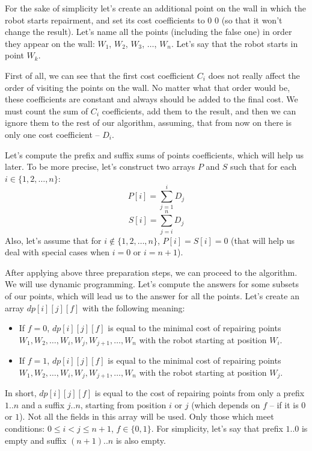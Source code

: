 

For the sake of simplicity let's create an additional point on the wall
	in which the robot starts repairment, and set its cost coefficients to $0$ $0$ (so that it won't change the result).
Let's name all the points (including the false one) in order they appear on the wall: $W_1$, $W_2$, $W_3$, $\ldots$, $W_n$.
Let's say that the robot starts in point $W_k$.

First of all, we can see that the first cost coefficient $C_i$ does not really affect the order of visiting
	the points on the wall.
No matter what that order would be, these coefficients are constant and always should be added to the final cost.
We must count the sum of $C_i$ coefficients, add them to the result, and then we can ignore them to the rest of our algorithm,
	assuming, that from now on there is only one cost coefficient -- $D_i$.

Let's compute the prefix and suffix sums of points coefficients, which will help us later.
To be more precise, let's construct two arrays $P$ and $S$ such that for each $i \in \{1, 2, \ldots, n\}$:
\[ P[i] = \sum_{j = 1}^i D_j \]
\[ S[i] = \sum_{j = i}^n D_j \]
Also, let's assume that for $i \not \in \{1, 2, \ldots, n\}$, $P[i] = S[i] = 0$
	(that will help us deal with special cases when $i = 0$ or $i = n+1$).

After applying above three preparation steps, we can proceed to the algorithm.
We will use dynamic programming.
Let's compute the answers for some subsets of our points, which will lead us to the answer for all the points.
Let's create an array $dp[i][j][f]$ with the following meaning:
\begin{itemize}
	\item If $f = 0$, $dp[i][j][f]$ is equal to the minimal cost of repairing points
		$W_1, W_2, \ldots, W_i, W_j, W_{j+1}, \ldots, W_n$ with the robot starting at position $W_i$.
	\item If $f = 1$, $dp[i][j][f]$ is equal to the minimal cost of repairing points
		$W_1, W_2, \ldots, W_i, W_j, W_{j+1}, \ldots, W_n$ with the robot starting at position $W_j$.
\end{itemize}
In short, $dp[i][j][f]$ is equal to the cost of repairing points from only a prefix $1..n$ and a suffix $j..n$,
	starting from position $i$ or $j$ (which depends on $f$ -- if it is $0$ or $1$).
Not all the fields in this array will be used.
Only those which meet conditions: $0 \le i < j \le n+1$, $f \in \{0, 1\}$.
For simplicity, let's say that prefix $1..0$ is empty and suffix $(n+1)..n$ is also empty.

